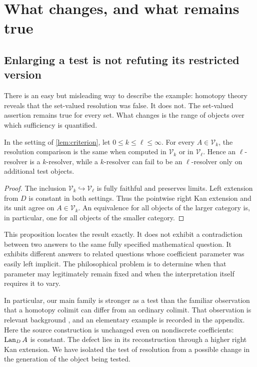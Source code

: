 \section{What changes, and what remains true}
\label{sec:change}

\subsection{Enlarging a test is not refuting its restricted version}

There is an easy but misleading way to describe the example: homotopy theory
reveals that the set-valued resolution was false. It does not. The
set-valued assertion remains true for every set. What changes is the range
of objects over which sufficiency is quantified.

\begin{proposition}\label{prop:persistence}
In the setting of \cref{lem:criterion}, let $0\leq k\leq\ell\leq\infty$.
For every $A\in\mathcal V_k$, the resolution comparison is the same when
computed in $\mathcal V_k$ or in $\mathcal V_\ell$. Hence an
$\ell$-resolver is a $k$-resolver, while a $k$-resolver can fail to be an
$\ell$-resolver only on additional test objects.
\end{proposition}

\begin{proof}
The inclusion $\mathcal V_k\hookrightarrow\mathcal V_\ell$ is fully
faithful and preserves limits. Left extension from $D$ is constant in both
settings. Thus the pointwise right Kan extension and its unit agree on
$A\in\mathcal V_k$. An equivalence for all objects of the larger
category is, in particular, one for all objects of the smaller category.
\end{proof}

This proposition locates the result exactly. It does not exhibit a
contradiction between two answers to the same fully specified mathematical
question. It exhibits different answers to related questions whose
coefficient parameter was easily left implicit. The philosophical problem is
to determine when that parameter may legitimately remain fixed and when
the interpretation itself requires it to vary.

In particular, our main family is stronger as a test than the familiar
observation that a homotopy colimit can differ from an ordinary colimit.
That observation is relevant background \cite{Dugger}, and an elementary
example is recorded in the appendix. Here the source construction is
unchanged even on nondiscrete coefficients: $\operatorname{Lan}_D A$ is constant.
The defect lies in its reconstruction through a higher right Kan
extension. We have isolated the test of resolution from a possible change
in the generation of the object being tested.

